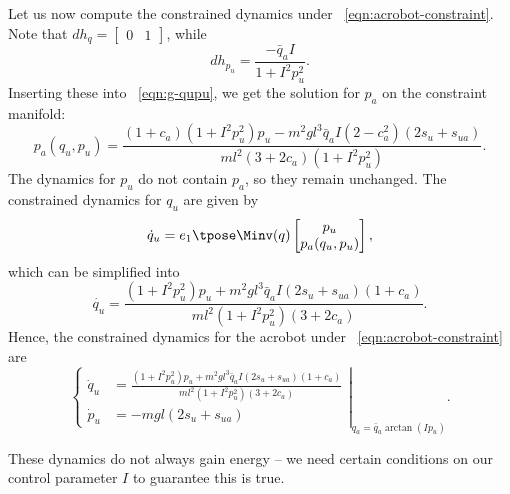 Let us now compute the constrained dynamics under
~\eqref{eqn:acrobot-constraint}.
Note that \(dh_q = \begin{bmatrix}0 & 1\end{bmatrix}\), while
\[
    dh_{p_u} = \frac{-\bar{q}_a I}{1 + I^2 p_u^2}
    .
\]
Inserting these into ~\eqref{eqn:g-qupu}, we get the solution for \(p_a\) on the
constraint manifold:
\[
    p_a(q_u,p_u) = \frac{
        (1+c_a)(1+I^2 p_u^2)p_u - m^2gl^3\bar{q}_a I (2-c_a^2)(2s_u + s_{ua})
    }{ml^2(3+2c_a)(1+I^2 p_u^2)}
    .
\]
The dynamics for \(p_u\) do not contain \(p_a\), so they remain unchanged.
The constrained dynamics for \(q_u\) are given by 
\begin{equation*}
    \dot{q}_u = e_1\tpose \Minv(q) \begin{bmatrix}
                    p_u \\ p_a(q_u,p_u)
                \end{bmatrix} %
    ,
\end{equation*}
which can be simplified into 
\begin{equation*}
    \dot{q_u} = \frac{(1+I^2 p_u^2)p_u + m^2gl^3\bar{q}_a I(2s_u + s_{ua})(1+c_a) }{ml^2(1+I^2 p_u^2)(3+2c_a)}
    .
\end{equation*}
Hence, the constrained dynamics for the acrobot under
~\eqref{eqn:acrobot-constraint} are
\begin{equation}\label{eqn:acrobot-constrained-dynamics}
\left.\begin{cases}
    \dot{q}_u &= \frac{(1+I^2 p_u^2)p_u + m^2gl^3\bar{q}_a I(2s_u + s_{ua})(1+c_a) }
            {ml^2(1+I^2 p_u^2)(3+2c_a)}
        \\
    \dot{p}_u &= - m g l (2s_u + s_{ua})
    \end{cases} \right|_{q_a = \bar{q}_a\arctan(Ip_u)}
    .
\end{equation}

These dynamics do not always gain energy -- we need certain conditions on our
control parameter \(I\) to guarantee this is true.

